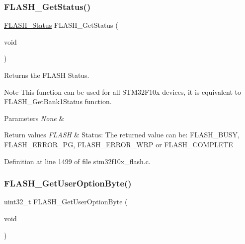 \subsubsection{\texorpdfstring{F\+L\+A\+S\+H\+\_\+\+Get\+Status()}{FLASH\_GetStatus()}}
{\footnotesize\ttfamily \hyperlink{group___f_l_a_s_h___exported___types_gadc63a6f3404ff1f71229a66915e9cdc0}{F\+L\+A\+S\+H\+\_\+\+Status} F\+L\+A\+S\+H\+\_\+\+Get\+Status (\begin{DoxyParamCaption}\item[{void}]{ }\end{DoxyParamCaption})}



Returns the F\+L\+A\+SH Status. 

\begin{DoxyNote}{Note}
This function can be used for all S\+T\+M32\+F10x devices, it is equivalent to F\+L\+A\+S\+H\+\_\+\+Get\+Bank1\+Status function. 
\end{DoxyNote}

\begin{DoxyParams}{Parameters}
{\em None} & \\
\hline
\end{DoxyParams}

\begin{DoxyRetVals}{Return values}
{\em F\+L\+A\+SH} & Status\+: The returned value can be\+: F\+L\+A\+S\+H\+\_\+\+B\+U\+SY, F\+L\+A\+S\+H\+\_\+\+E\+R\+R\+O\+R\+\_\+\+PG, F\+L\+A\+S\+H\+\_\+\+E\+R\+R\+O\+R\+\_\+\+W\+RP or F\+L\+A\+S\+H\+\_\+\+C\+O\+M\+P\+L\+E\+TE \\
\hline
\end{DoxyRetVals}


Definition at line 1499 of file stm32f10x\+\_\+flash.\+c.

\mbox{\label{group___f_l_a_s_h___exported___functions_ga31441647fac5fbb38369613076737943}} 
\subsubsection{\texorpdfstring{F\+L\+A\+S\+H\+\_\+\+Get\+User\+Option\+Byte()}{FLASH\_GetUserOptionByte()}}
{\footnotesize\ttfamily uint32\+\_\+t F\+L\+A\+S\+H\+\_\+\+Get\+User\+Option\+Byte (\begin{DoxyParamCaption}\item[{void}]{ }\end{DoxyParamCaption})}



